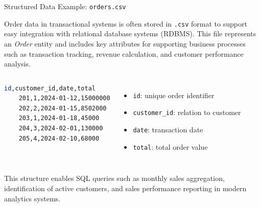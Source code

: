 \documentclass[aspectratio=169, table]{beamer}
\begin{document}
\begin{frame}[fragile]{Structured Data Example: \texttt{orders.csv}}
\vspace{20pt}

Order data in transactional systems is often stored in \texttt{.csv} format to support easy integration with relational database systems (RDBMS). This file represents an \emph{Order} entity and includes key attributes for supporting business processes such as transaction tracking, revenue calculation, and customer performance analysis.

\begin{columns}[T,onlytextwidth]

\begin{lstlisting}[language=bash, caption={file \texttt{orders.csv}}, basicstyle=\ttfamily\scriptsize, label={lst:orders_csv}]
	id,customer_id,date,total
	201,1,2024-01-12,15000000
	202,2,2024-01-15,8502000
	203,1,2024-01-18,45000
	204,3,2024-02-01,130000
	205,4,2024-02-10,68000
\end{lstlisting}

\begin{itemize}
	\item \texttt{id}: unique order identifier  
	\item \texttt{customer\_id}: relation to customer  
	\item \texttt{date}: transaction date  
	\item \texttt{total}: total order value  
\end{itemize}

\end{columns}

This structure enables SQL queries such as monthly sales aggregation, identification of active customers, and sales performance reporting in modern analytics systems.

\end{frame}
\end{document}
